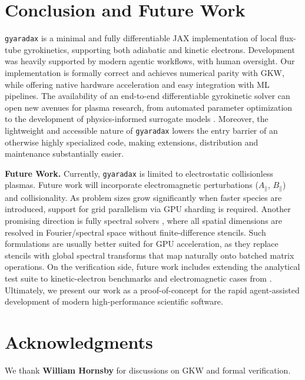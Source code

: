 \documentclass{article}
\theoremstyle{plain}
\theoremstyle{definition}
\theoremstyle{remark}
\begin{document}
\section{Conclusion and Future Work}
\texttt{gyaradax} is a minimal and fully differentiable JAX implementation of local flux-tube gyrokinetics, supporting both adiabatic and kinetic electrons.
Development was heavily supported by modern agentic workflows, with human oversight.
%
Our implementation is formally correct and achieves numerical parity with GKW, while offering native hardware acceleration and easy integration with ML pipelines.
%
The availability of an end-to-end differentiable gyrokinetic solver can open new avenues for plasma research, from automated parameter optimization \cite{McGreivy_2021,joglekar2026differentiableprogrammingplasmaphysics} to the development of physics-informed surrogate models \cite{um2021solverinthelooplearningdifferentiablephysics,Karniadakis2021}.
%
Moreover, the lightweight and accessible nature of \texttt{gyaradax} lowers the entry barrier of an otherwise highly specialized code, making extensions, distribution and maintenance substantially easier.

\textbf{Future Work.}
Currently, \texttt{gyaradax} is limited to electrostatic collisionless plasmas. Future work will incorporate electromagnetic perturbations ($A_\parallel$, $B_\parallel$) and collisionality. As problem sizes grow significantly when faster species are introduced, support for grid parallelism via GPU sharding \cite{xu2021gspmdgeneralscalableparallelization} is required.
Another promising direction is fully spectral solvers \cite{CANDY201673}, where all spatial dimensions are resolved in Fourier/spectral space without finite-difference stencils. Such formulations are usually better suited for GPU acceleration, as they replace stencils with global spectral transforms that map naturally onto batched matrix operations.
%
On the verification side, future work includes extending the analytical test suite to kinetic-electron benchmarks and electromagnetic cases from \citet{PEETERS_GKW_2009}.
%
Ultimately, we present our work as a proof-of-concept for the rapid agent-assisted development of modern high-performance scientific software.

\section*{Acknowledgments}
We thank \textbf{William Hornsby} for discussions on GKW and formal verification.
\end{document}
